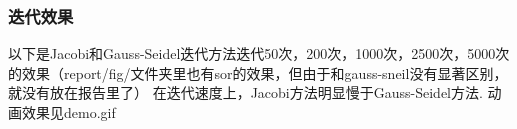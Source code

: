 \documentclass[a4paper]{article}
\begin{document}
\subsubsection{迭代效果}

以下是Jacobi和Gauss-Seidel迭代方法迭代50次，200次，1000次，2500次，5000次的效果（report/fig/文件夹里也有sor的效果，但由于和gauss-sneil没有显著区别，就没有放在报告里了）
在迭代速度上，Jacobi方法明显慢于Gauss-Seidel方法. 动画效果见demo.gif

\begin{figure}[htpb]
  \centering 
\end{figure}
\end{document}
